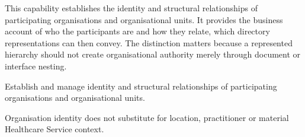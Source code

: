 This capability establishes the identity and structural relationships of participating organisations and organisational units. It provides the business account of who the participants are and how they relate, which directory representations can then convey. The distinction matters because a represented hierarchy should not create organisational authority merely through document or interface nesting.



Establish and manage identity and structural relationships of participating organisations and organisational units.



Organisation identity does not substitute for location, practitioner or material Healthcare Service context.


